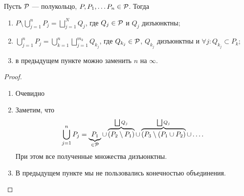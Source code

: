 \begin{thm}
    Пусть $ \P$ --- полукольцо, $ P, P_1, \ldots P_n \in \P$. Тогда
	\begin{enumerate}[noitemsep]
	    \item $ P \setminus \bigcup\limits_{j=1}^{n}P_j = \bigsqcup\limits_{j=1}^{N} Q_{j}$, где $ Q_{j} \in \P$ и $ Q_j$ дизъюнктны;
		\item $ \bigcup\limits_{j=1}^{n}P_j = \bigcup\limits_{k=1}^{n}\bigsqcup\limits_{j=1}^{m_{k}} Q_{k_j}$, где $ Q_{k_j} \in \P$, $ Q_{k_j}$ дизъюнктны и $ \forall j \colon Q_{k_j} \subset P_k$;
		\item в предыдущем пункте можно заменить $ n $ на $ \infty$.
	\end{enumerate} 
\end{thm}
\begin{proof}
	\begin{enumerate}
	    \item Очевидно
		\item  Заметим, что 
			\[
				\bigcup_{j=1}^{n}P_j = \underbrace{P_1}_{ \in \P} \cup \overbrace{(P_{2} \setminus P_1)}^{\bigsqcup Q_{j}} \cup \overbrace{(P_{3} \setminus (P_1 \cup P_2)}^{\bigsqcup Q_{j}} \cup  \ldots 
			.\] 
			При этом все полученные множества дизъюнктны.
		\item В предыдущем пункте мы не пользовались конечностью объединения.
	\end{enumerate} 
\end{proof}


